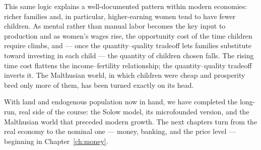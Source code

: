 This same logic explains a well-documented pattern within modern economies: richer families and, in particular, higher-earning women tend to have fewer children. As mental rather than manual labor becomes the key input to production and as women's wages rise, the opportunity cost of the time children require climbs, and --- once the quantity--quality tradeoff lets families substitute toward investing in each child --- the quantity of children chosen falls. The rising time cost flattens the income--fertility relationship; the quantity--quality tradeoff inverts it. The Malthusian world, in which children were cheap and prosperity bred only more of them, has been turned exactly on its head.


With land and endogenous population now in hand, we have completed the long-run, real side of the course: the Solow model, its microfounded version, and the Malthusian world that preceded modern growth. The next chapters turn from the real economy to the nominal one --- money, banking, and the price level --- beginning in Chapter~\ref{ch:money}.
